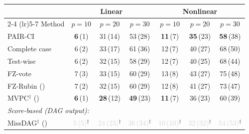 \begin{tabular}{lcccccc}
    \toprule
                  & \multicolumn{3}{c}{Linear} & \multicolumn{3}{c}{Nonlinear} \\
    \cmidrule(lr){2-4} \cmidrule(lr){5-7}
    Method        & $p{=}10$ & $p{=}20$ & $p{=}30$ & $p{=}10$ & $p{=}20$ & $p{=}30$ \\
    \midrule
    PAIR-CI                                       & \textbf{6}\,{\scriptsize(1)} & 31\,{\scriptsize(14)} & 53\,{\scriptsize(28)} & \textbf{11}\,{\scriptsize(7)} & \textbf{35}\,{\scriptsize(23)} & \textbf{58}\,{\scriptsize(38)} \\
    Complete case                                 & 6\,{\scriptsize(2)} & 33\,{\scriptsize(17)} & 61\,{\scriptsize(36)} & 12\,{\scriptsize(7)} & 40\,{\scriptsize(27)} & 68\,{\scriptsize(50)} \\
    Test-wise                                     & 6\,{\scriptsize(2)} & 32\,{\scriptsize(15)} & 58\,{\scriptsize(29)} & 12\,{\scriptsize(7)} & 40\,{\scriptsize(25)} & 68\,{\scriptsize(44)} \\
    FZ-vote                                       & 7\,{\scriptsize(3)} & 33\,{\scriptsize(15)} & 60\,{\scriptsize(29)} & 13\,{\scriptsize(8)} & 43\,{\scriptsize(27)} & 75\,{\scriptsize(48)} \\
    FZ-Rubin (\citeauthor{witte2022multiple})     & 7\,{\scriptsize(2)} & 32\,{\scriptsize(15)} & 60\,{\scriptsize(29)} & 12\,{\scriptsize(8)} & 41\,{\scriptsize(27)} & 73\,{\scriptsize(47)} \\
    MVPC$^\ddagger$ (\citeauthor{tu2019causal})   & \textbf{6}\,{\scriptsize(1)} & \textbf{28}\,{\scriptsize(12)} & \textbf{49}\,{\scriptsize(23)} & \textbf{11}\,{\scriptsize(7)} & 36\,{\scriptsize(23)} & 60\,{\scriptsize(39)} \\
    \midrule
    \multicolumn{7}{l}{\emph{Score-based (DAG output):}} \\
    MissDAG$^\dagger$ (\citeauthor{gao2022missdag}) & \textcolor{lightgray}{5\,{\scriptsize(5)}}$^\dagger$ & \textcolor{lightgray}{24\,{\scriptsize(23)}}$^\dagger$ & \textcolor{lightgray}{36\,{\scriptsize(34)}}$^\dagger$ & \textcolor{lightgray}{10\,{\scriptsize(10)}}$^\dagger$ & \textcolor{lightgray}{32\,{\scriptsize(32)}}$^\dagger$ & \textcolor{lightgray}{54\,{\scriptsize(53)}}$^\dagger$ \\
    \bottomrule
\end{tabular}
